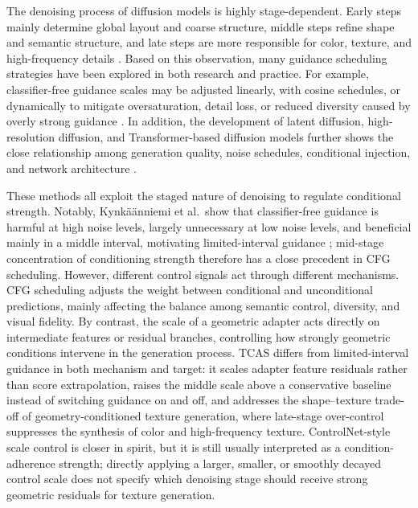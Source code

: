 \documentclass[times,twocolumn,final]{elsarticle}
\providecommand{\DIFadd}[1]{{\protect\color{blue} \sf #1}} %
\providecommand{\DIFaddbegin}{} %
\providecommand{\DIFaddend}{} %
\newcommand{\DIFaddincludegraphics}[2][]{{\color{blue}\fbox{\DIFOincludegraphics[#1]{#2}}}} %
\DeclareRobustCommand{\DIFaddbegin}{\DIFOaddbegin \let\includegraphics\DIFaddincludegraphics} %
\DeclareRobustCommand{\DIFaddend}{\DIFOaddend \let\includegraphics\DIFOincludegraphics} %
\begin{document}
The denoising process of diffusion models is highly stage-dependent. Early steps mainly determine global layout and coarse structure, middle steps refine shape and semantic structure, and late steps are more responsible for color, texture, and high-frequency details \cite{ho2020ddpm,song2021ddim}. Based on this observation, many guidance scheduling strategies have been explored in both research and practice. For example, classifier-free guidance scales may be adjusted linearly, with cosine schedules, or dynamically to mitigate oversaturation, detail loss, or reduced diversity caused by overly strong guidance \cite{ho2022cfg,castillo2023adaptive}. In addition, the development of latent diffusion, high-resolution diffusion, and Transformer-based diffusion models further shows the close relationship among generation quality, noise schedules, conditional injection, and network architecture \cite{rombach2022ldm,esser2024scaling,blackforestlabs2024flux,loshchilov2019decoupled,cherti2023reproducible,nichol2022glide,saharia2022photorealistic,peebles2023scalable}.

These methods all exploit the staged nature of denoising to regulate conditional strength. \DIFaddbegin \DIFadd{Notably, Kynk\"a\"anniemi et al.\ show that classifier-free guidance is harmful at high noise levels, largely unnecessary at low noise levels, and beneficial mainly in a middle interval, motivating limited-interval guidance \cite{kynkanniemi2024limited}; mid-stage concentration of conditioning strength therefore has a close precedent in CFG scheduling. }\DIFaddend However, different control signals act through different mechanisms. CFG scheduling adjusts the weight between conditional and unconditional predictions, mainly affecting the balance among semantic control, diversity, and visual fidelity. By contrast, the scale of a geometric adapter acts directly on intermediate features or residual branches, controlling how strongly geometric conditions intervene in the generation process. \DIFaddbegin \DIFadd{TCAS differs from limited-interval guidance in both mechanism and target: it scales adapter feature residuals rather than score extrapolation, raises the middle scale above a conservative baseline instead of switching guidance on and off, and addresses the shape--texture trade-off of geometry-conditioned texture generation, where late-stage over-control suppresses the synthesis of color and high-frequency texture. }\DIFaddend ControlNet-style scale control is closer in spirit, but it is still usually interpreted as a condition-adherence strength; directly applying a larger, smaller, or smoothly decayed control scale does not specify which denoising stage should receive strong geometric residuals for texture generation.
\end{document}

